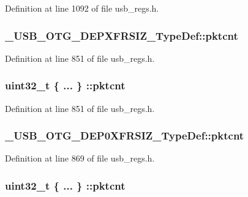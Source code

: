 Definition at line 1092 of file usb\-\_\-regs.\-h.

\hypertarget{group___u_s_b___o_t_g___d_r_i_v_e_r_ga77695bfee6d56fa56701a78625cf641f}{
\subsubsection[{pktcnt}]{ \-\_\-\-U\-S\-B\-\_\-\-O\-T\-G\-\_\-\-D\-E\-P\-X\-F\-R\-S\-I\-Z\-\_\-\-Type\-Def\-::pktcnt}}\label{group___u_s_b___o_t_g___d_r_i_v_e_r_ga77695bfee6d56fa56701a78625cf641f}


Definition at line 851 of file usb\-\_\-regs.\-h.

\hypertarget{group___u_s_b___o_t_g___d_r_i_v_e_r_gaa01a922b8fd7b7aecd8aeb44c17877e5}{
\subsubsection[{pktcnt}]{\setlength{\rightskip}{0pt plus 5cm}uint32\-\_\-t \{ ... \} \-::pktcnt}}\label{group___u_s_b___o_t_g___d_r_i_v_e_r_gaa01a922b8fd7b7aecd8aeb44c17877e5}


Definition at line 851 of file usb\-\_\-regs.\-h.

\hypertarget{group___u_s_b___o_t_g___d_r_i_v_e_r_ga903035f15b46865c694e6f28bceb81d6}{
\subsubsection[{pktcnt}]{ \-\_\-\-U\-S\-B\-\_\-\-O\-T\-G\-\_\-\-D\-E\-P0\-X\-F\-R\-S\-I\-Z\-\_\-\-Type\-Def\-::pktcnt}}\label{group___u_s_b___o_t_g___d_r_i_v_e_r_ga903035f15b46865c694e6f28bceb81d6}


Definition at line 869 of file usb\-\_\-regs.\-h.

\hypertarget{group___u_s_b___o_t_g___d_r_i_v_e_r_gaea192185a0bb812942b703c3532a19d5}{
\subsubsection[{pktcnt}]{\setlength{\rightskip}{0pt plus 5cm}uint32\-\_\-t \{ ... \} \-::pktcnt}}\label{group___u_s_b___o_t_g___d_r_i_v_e_r_gaea192185a0bb812942b703c3532a19d5}


